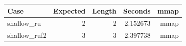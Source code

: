 {\small
\begin{tabular}{lrrrr}
\hline
Case & Expected & Length & Seconds & mmap \\
\hline
shallow\_ru & 2 & 2 & 2.152673 & mmap \\
shallow\_ruf2 & 3 & 3 & 2.397738 & mmap \\
\hline
\end{tabular}
}
